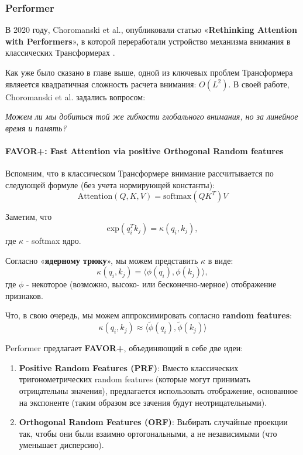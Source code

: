 \subsubsection{Performer}

В 2020 году, Choromanski et al., опубликовали статью 
«\textbf{Rethinking Attention with Performers}», в которой 
переработали устройство механизма внимания в классических Трансформерах 
\cite{performer}. 

Как уже было сказано в главе выше, одной из ключевых проблем Трансформера 
являеется квадратичная сложность расчета внимания: $O(L^2)$. В своей работе, 
Choromanski et al. задались вопросом:
\begin{center}
    \itshape
    Можем ли мы добиться той же гибкости глобального внимания, но за линейное время и память?
\end{center}

\paragraph{FAVOR+: Fast Attention via positive Orthogonal Random features}

Вспомним, что в классическом Трансформере \cite{vaswani2017attention} 
внимание рассчитывается по следующей формуле (без учета нормирующей константы):
\begin{equation*}
    \text{Attention}(Q, K, V) = \text{softmax}(QK^T)V
\end{equation*}

Заметим, что
\begin{equation*}
    \text{exp}(q_i^T k_j) = \kappa (q_i, k_j),
\end{equation*}
где $\kappa$ - softmax ядро.

Согласно «\textbf{ядерному трюку}», мы можем представить $\kappa$ в виде:
\begin{equation*}
    \kappa(q_i, k_j) = \langle \phi(q_i), \phi(k_j) \rangle,
\end{equation*}
где $\phi$ - некоторое (возможно, высоко- или бесконечно-мерное) отображение признаков.

Что, в свою очередь, мы можем аппроксимировать согласно \textbf{random features}:
\begin{equation*}
    \kappa(q_i, k_j) \approx \langle \widetilde{\phi}(q_i), \widetilde{\phi}(k_j) \rangle
\end{equation*}

Performer предлагает \textbf{FAVOR+}, объединяющий в себе две идеи:
\begin{enumerate}
    \item \textbf{Positive Random Features (PRF)}: Вместо классических тригонометрических random features (которые могут принимать отрицательны значения), предлагается использовать отображение, основанное на экспоненте (таким образом все зачения будут неотрицательными).
    \item \textbf{Orthogonal Random Features (ORF)}: Выбирать случайные проекции так, чтобы они были взаимно ортогональными, а не независимыми (что уменьшает дисперсию).
\end{enumerate}

